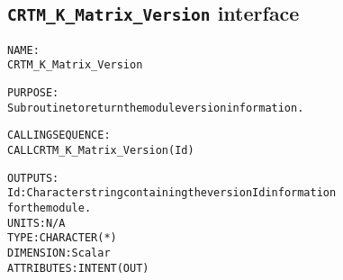 \subsection{\texttt{CRTM\_K\_Matrix\_Version} interface}
  \label{sec:CRTM_K_Matrix_Version_interface}
  \begin{alltt}
 
  NAME:
        CRTM_K_Matrix_Version
 
  PURPOSE:
        Subroutine to return the module version information.
 
  CALLING SEQUENCE:
        CALL CRTM_K_Matrix_Version( Id )
 
  OUTPUTS:
        Id:            Character string containing the version Id information
                       for the module.
                       UNITS:      N/A
                       TYPE:       CHARACTER(*)
                       DIMENSION:  Scalar
                       ATTRIBUTES: INTENT(OUT)
 
  \end{alltt}
